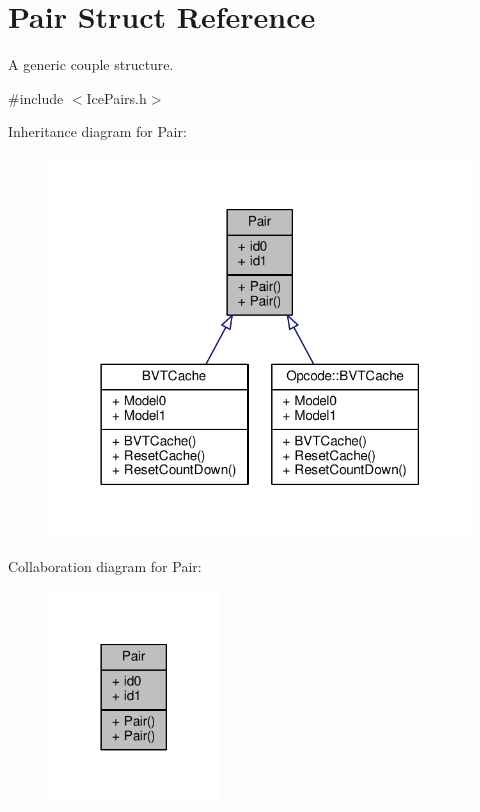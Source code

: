 \hypertarget{structPair}{}\section{Pair Struct Reference}
\label{structPair}


A generic couple structure.  




{\ttfamily \#include $<$Ice\+Pairs.\+h$>$}



Inheritance diagram for Pair\+:
\nopagebreak
\begin{figure}[H]
\begin{center}
\leavevmode
\includegraphics[width=318pt]{d3/de3/structPair__inherit__graph}
\end{center}
\end{figure}


Collaboration diagram for Pair\+:
\nopagebreak
\begin{figure}[H]
\begin{center}
\leavevmode
\includegraphics[width=129pt]{d8/d59/structPair__coll__graph}
\end{center}
\end{figure}
